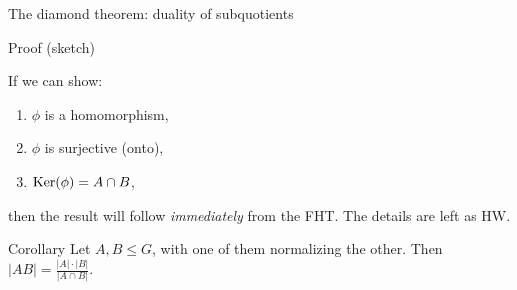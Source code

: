 \documentclass[8pt, handout]{beamer}
\newcommand{\Pause}{}      %
\begin{document}
\begin{frame}{The diamond theorem: duality of subquotients}
\begin{exampleblock}{Proof (sketch)}
    \vspace{-6mm}\Pause
    
    If we can show: \vspace{-2mm}\Pause
    \begin{multicols}{3}
      \begin{enumerate}
      \item $\phi$ is a homomorphism, %
      \item $\phi$ is surjective (onto), %
      \item $\operatorname{Ker}(\phi)=A\cap B$, 
      \end{enumerate}
    \end{multicols}
    
    \vspace{-2mm}
    
    then the result will follow \emph{immediately} from the FHT. %
    The details are left as HW.   
  \end{exampleblock}
  
  \Pause
  
  \begin{block}{Corollary}
    Let $A,B\leq G$, with one of them normalizing the other. Then
    $
    \displaystyle|AB|=\frac{|A|\cdot|B|}{|A\cap B|}.
    $
  \end{block}
  
\end{frame}

\end{document}
